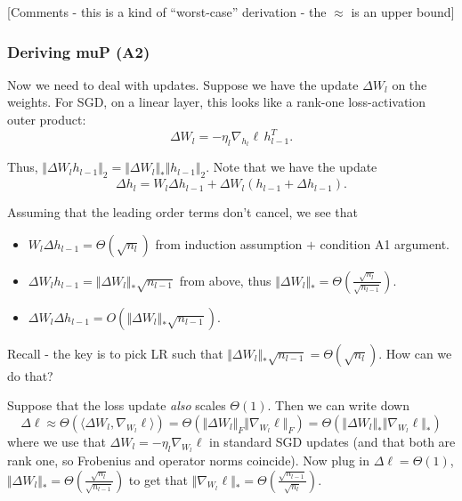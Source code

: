 \documentclass[12pt,twoside]{article}
\begin{document}
[Comments - this is a kind of ``worst-case'' derivation - the \(\approx\) is an upper bound]

\subsubsection*{Deriving muP (A2)}

Now we need to deal with updates. Suppose we have the update \(\Delta W_l\) on the weights. For SGD, on a linear layer, this looks like a rank-one loss-activation outer product:
\[
    \Delta W_l = -\eta_{l}\nabla_{h_l} \ell \, h_{l-1}^T.
\]

Thus, \(\Vert \Delta W_l h_{l-1} \Vert_2 = \Vert \Delta W_l \Vert_{*} \Vert h_{l-1} \Vert_2\). Note that we have the update
\[
    \Delta h_l = W_l \Delta h_{l-1} + \Delta W_l(h_{l-1} + \Delta h_{l-1}).
\]

Assuming that the leading order terms don't cancel, we see that
\begin{itemize}
    \item \(W_l \Delta h_{l-1} = \Theta(\sqrt{n_l})\) from induction assumption \(+\) condition A1 argument.
    \item \(\Delta W_l h_{l-1} = \Vert \Delta W_l \Vert_{*} \sqrt{n_{l-1}}\) from above, thus \(\Vert \Delta W_l \Vert_{*} = \Theta\left(\frac{\sqrt{n_l}}{\sqrt{n_{l-1}}}\right)\).
    \item \(\Delta W_l \Delta h_{l-1} = O(\Vert \Delta W_l \Vert_{*} \sqrt{n_{l-1}})\).
\end{itemize}

\begin{center}
    Recall - the key is to pick LR such that \(\Vert \Delta W_l \Vert_{*} \sqrt{n_{l-1}} = \Theta(\sqrt{n_l})\). How can we do that?
\end{center}

Suppose that the loss update \textit{also} scales \(\Theta(1)\). Then we can write down
\[
    \Delta \ell \approx \Theta(\langle\Delta W_l, \nabla_{W_l}\ell\rangle) = \Theta(\Vert \Delta W_l \Vert_F \Vert \nabla_{W_l}\ell \Vert_F) = \Theta(\Vert \Delta W_l \Vert_{*} \Vert \nabla_{W_l} \ell \Vert_{*})
\]
where we use that \(\Delta W_l = -\eta_l \nabla_{W_l} \ell\) in standard SGD updates (and that both are rank one, so Frobenius and operator norms coincide). Now plug in \(\Delta \ell = \Theta(1)\), \(\Vert \Delta W_l \Vert_{*} = \Theta\left(\frac{\sqrt{n_l}}{\sqrt{n_{l-1}}}\right)\) to get that \(\Vert \nabla_{W_l} \ell \Vert_{*} = \Theta\left(\frac{\sqrt{n_{l-1}}}{\sqrt{n_l}}\right)\).
\end{document}
